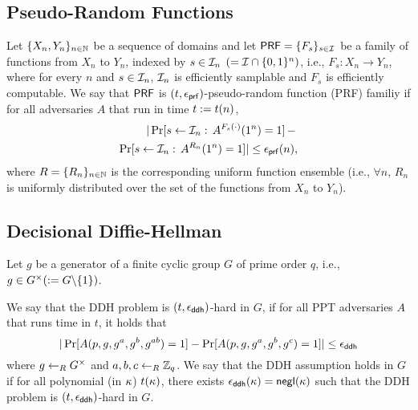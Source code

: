 \subsection{Pseudo-Random Functions} \label{sec:prf}
Let $\{X_n,Y_n\}_{n \in \mathbb{N}}$ be a sequence of domains
and let $\mathsf{PRF} = \{F_{s}\}_{s \in \mathcal{I}}$ be a family
of functions from $X_n$ to $Y_n$, indexed by $s \in
\mathcal{I}_{n}$ $(= \mathcal{I} \cap \{0,1\}^{n})$, i.e.,
$F_{s} : X_n \to Y_n$, where for every $n$ and
$s \in \mathcal{I}_n$, $\mathcal{I}_n$ is efficiently samplable
and $F_s$ is efficiently computable.
We say that $\mathsf{PRF}$ is $(t,\epsilon_{\mathsf{prf}})$-pseudo-random
function (PRF) familiy if for all adversaries $A$ that
run in time $t:= t(n)$,
\begin{eqnarray}
 |\Pr[s \gets {\mathcal{I}}_{n}: \, A^{F_s(\cdot)}(1^n)=1] \, - \, \nonumber \\
 \Pr[s \gets {\mathcal{I}}_{n}: \, A^{R_n}(1^n)=1] |
 \leq \epsilon_{\mathsf{prf}}(n),
\end{eqnarray}
where $R=\{R_n\}_{n\in \mathbb{N}}$ is the corresponding uniform
function ensemble (i.e., $\forall n$, $R_n$ is uniformly
distributed over the set of the functions from $X_n$ to
$Y_n$).

\subsection{Decisional Diffie-Hellman} \label{sec:assumption}
Let $g$ be a generator of a finite cyclic group $G$ of
prime order $q$, i.e.,
$g \in G^{\times}(:= G\backslash \{1\})$.

\begin{definition}
 We say that the DDH problem is $(t,\epsilon_{\mathsf{ddh}})$-hard
 in $G$, if for all PPT adversaries $A$ that runs time
 in $t$, it holds that
 \begin{equation}
  |\Pr[A(p,g,g^a,g^b,g^{ab}) = 1] - \Pr[A(p,g,g^a,g^b,g^c)
  = 1]| \leq \epsilon_{\mathsf{ddh}}
 \end{equation}
 where $g \getsr G^{\times}$ and
 $a,b,c \getsr \mathbb{Z}_{q}$.
 We say that the DDH assumption holds in $G$ if for all
 polynomial (in $\kappa$) $t(\kappa)$, there exists
 $\epsilon_{\mathsf{ddh}}(\kappa)=\mathsf{negl}(\kappa)$ such that the
 DDH problem is $(t,\epsilon_{\mathsf{ddh}})$-hard in $G$.
\end{definition}

